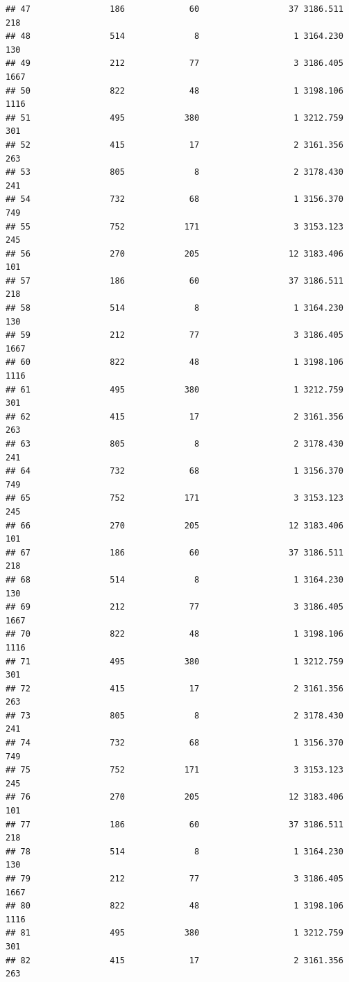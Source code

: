 \documentclass[
]{article}
\begin{document}
\begin{verbatim}
## 47                186             60                  37 3186.511  218
## 48                514              8                   1 3164.230  130
## 49                212             77                   3 3186.405 1667
## 50                822             48                   1 3198.106 1116
## 51                495            380                   1 3212.759  301
## 52                415             17                   2 3161.356  263
## 53                805              8                   2 3178.430  241
## 54                732             68                   1 3156.370  749
## 55                752            171                   3 3153.123  245
## 56                270            205                  12 3183.406  101
## 57                186             60                  37 3186.511  218
## 58                514              8                   1 3164.230  130
## 59                212             77                   3 3186.405 1667
## 60                822             48                   1 3198.106 1116
## 61                495            380                   1 3212.759  301
## 62                415             17                   2 3161.356  263
## 63                805              8                   2 3178.430  241
## 64                732             68                   1 3156.370  749
## 65                752            171                   3 3153.123  245
## 66                270            205                  12 3183.406  101
## 67                186             60                  37 3186.511  218
## 68                514              8                   1 3164.230  130
## 69                212             77                   3 3186.405 1667
## 70                822             48                   1 3198.106 1116
## 71                495            380                   1 3212.759  301
## 72                415             17                   2 3161.356  263
## 73                805              8                   2 3178.430  241
## 74                732             68                   1 3156.370  749
## 75                752            171                   3 3153.123  245
## 76                270            205                  12 3183.406  101
## 77                186             60                  37 3186.511  218
## 78                514              8                   1 3164.230  130
## 79                212             77                   3 3186.405 1667
## 80                822             48                   1 3198.106 1116
## 81                495            380                   1 3212.759  301
## 82                415             17                   2 3161.356  263

\end{verbatim}
\end{document}
